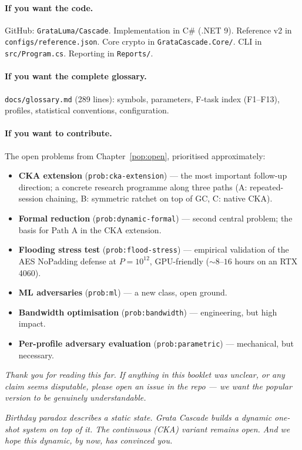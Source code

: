 \documentclass[11pt,a4paper]{article}
\begin{document}
\paragraph{If you want the code.} GitHub: \texttt{GrataLuma/Cascade}. Implementation in C\# (.NET 9). Reference v2 in \texttt{configs/reference.json}. Core crypto in \texttt{GrataCascade.Core/}. CLI in \texttt{src/Program.cs}. Reporting in \texttt{Reports/}.

\paragraph{If you want the complete glossary.} \texttt{docs/glossary.md} (289 lines): symbols, parameters, F-task index (F1--F13), profiles, statistical conventions, configuration.

\paragraph{If you want to contribute.} The open problems from Chapter~\ref{pop:open}, prioritised approximately:
\begin{itemize}[leftmargin=*]
\item \textbf{CKA extension} (\texttt{prob:cka-extension}) --- the most important follow-up direction; a concrete research programme along three paths (A: repeated-session chaining, B: symmetric ratchet on top of GC, C: native CKA).
\item \textbf{Formal reduction} (\texttt{prob:dynamic-formal}) --- second central problem; the basis for Path A in the CKA extension.
\item \textbf{Flooding stress test} (\texttt{prob:flood-stress}) --- empirical validation of the AES NoPadding defense at $P = 10^{12}$, GPU-friendly ($\sim 8$--$16$ hours on an RTX 4060).
\item \textbf{ML adversaries} (\texttt{prob:ml}) --- a new class, open ground.
\item \textbf{Bandwidth optimisation} (\texttt{prob:bandwidth}) --- engineering, but high impact.
\item \textbf{Per-profile adversary evaluation} (\texttt{prob:parametric}) --- mechanical, but necessary.
\end{itemize}

\bigskip

\noindent\textit{Thank you for reading this far. If anything in this booklet was unclear, or any claim seems disputable, please open an issue in the repo --- we want the popular version to be genuinely understandable.}

\medskip
\noindent\emph{Birthday paradox describes a static state. Grata Cascade builds a dynamic one-shot system on top of it. The continuous (CKA) variant remains open. And we hope this dynamic, by now, has convinced you.}
\end{document}
